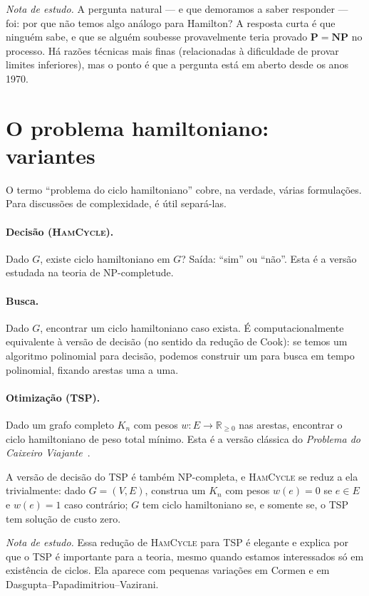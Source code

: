 \documentclass[11pt,a4paper]{article}
\theoremstyle{definition}
\newcommand{\nota}[1]{%
  \par\medskip
  {\small\color{notagray}\textit{Nota de estudo.} #1}\par\medskip
}
\begin{document}
\nota{A pergunta natural --- e que demoramos a saber responder --- foi: por que não temos algo análogo para Hamilton? A resposta curta é que ninguém sabe, e que se alguém soubesse provavelmente teria provado $\mathbf{P} = \mathbf{NP}$ no processo. Há razões técnicas mais finas (relacionadas à dificuldade de provar limites inferiores), mas o ponto é que a pergunta está em aberto desde os anos 1970.}

\section{O problema hamiltoniano: variantes}

O termo ``problema do ciclo hamiltoniano'' cobre, na verdade, várias formulações. Para discussões de complexidade, é útil separá-las.

\paragraph{Decisão (\textsc{HamCycle}).} Dado $G$, existe ciclo hamiltoniano em $G$? Saída: ``sim'' ou ``não''. Esta é a versão estudada na teoria de NP-completude.

\paragraph{Busca.} Dado $G$, encontrar um ciclo hamiltoniano caso exista. É computacionalmente equivalente à versão de decisão (no sentido da redução de Cook): se temos um algoritmo polinomial para decisão, podemos construir um para busca em tempo polinomial, fixando arestas uma a uma.

\paragraph{Otimização (TSP).} Dado um grafo completo $K_n$ com pesos $w : E \to \mathbb{R}_{\geq 0}$ nas arestas, encontrar o ciclo hamiltoniano de peso total mínimo. Esta é a versão clássica do \emph{Problema do Caixeiro Viajante}~\citep{cormen2012}.

A versão de decisão do TSP é também NP-completa, e \textsc{HamCycle} se reduz a ela trivialmente: dado $G = (V, E)$, construa um $K_n$ com pesos $w(e) = 0$ se $e \in E$ e $w(e) = 1$ caso contrário; $G$ tem ciclo hamiltoniano se, e somente se, o TSP tem solução de custo zero.

\nota{Essa redução de \textsc{HamCycle} para TSP é elegante e explica por que o TSP é importante para a teoria, mesmo quando estamos interessados só em existência de ciclos. Ela aparece com pequenas variações em Cormen e em Dasgupta--Papadimitriou--Vazirani.}
\end{document}
